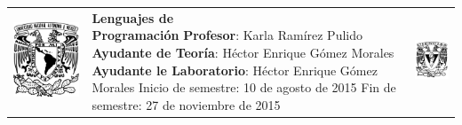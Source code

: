 \documentclass[10pt]{article}
\begin{document}
\begin{center}
  \begin{tabular}[h]{c C{10cm} c}
    \includegraphics[scale=.2]{cover.png} &
    \textbf{{\Large Lenguajes de \newline Programación}}
    \newline \textbf{Profesor}: Karla Ramírez Pulido
    \newline \textbf{Ayudante de Teoría}: Héctor Enrique Gómez Morales
    \newline \textbf{Ayudante le Laboratorio}: Héctor Enrique Gómez Morales
    \newline Inicio de semestre: 10 de agosto de 2015
    \newline Fin de semestre: 27 de noviembre de 2015 &
    \includegraphics[scale=.4]{cover2.png}
  \end{tabular}
\end{center}
\end{document}

